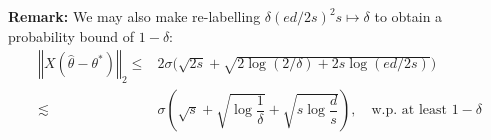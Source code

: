 \documentclass[11pt,a4paper]{article}
\numberwithin{equation}{section}%
\begin{document}
\textbf{Remark:} We may also make re-labelling $ \delta (ed/2s)^2s \mapsto \delta $ to obtain a probability bound of $ 1-\delta $:
\begin{align*}
    \left\Vert X(\hat{\theta }-\theta ^*) \right\Vert _2 \leq&  2\sigma \bigl( \sqrt{2s} + \sqrt{2\log (2/\delta ) + 2s\log (ed/2s)} \bigr) \\
    \lesssim & \sigma \left( \sqrt{s} + \sqrt{\log\dfrac{ 1 }{ \delta  } } + \sqrt{s\log\dfrac{ d }{ s } } \right) ,\quad \text{w.p. at least } 1- \delta
\end{align*}
\end{document}
